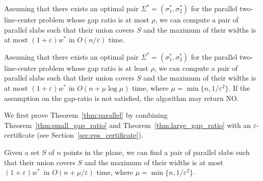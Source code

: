 \documentclass[english,a4paper, cleveref, autoref, thm-restate, nolineno]{socg-lipics-v2021}
\theoremstyle{star}
\theoremstyle{claimstar}
\newcommand{\eps}{\ensuremath{\varepsilon}}
\begin{document}
\begin{theorem}
    \label{thm:small_gap_ratio}
    Assuming that there exists an optimal pair $\Sigma^* = (\sigma_1^*, \sigma_2^*)$ for the parallel two-line-center problem whose gap ratio is at most $\rho$, 
    we can compute a pair of parallel slabs such that their union covers $S$ and the maximum of their widths is at most $(1+\eps)w^*$ in $O(n/\eps)$ time. 
\end{theorem}

\begin{theorem}
    \label{thm:large_gap_ratio}
    Assuming that there exists an optimal pair $\Sigma^* = (\sigma_1^*, \sigma_2^*)$ for the parallel two-line-center problem whose gap ratio is at least $\rho$, 
    we can compute a pair of parallel slabs such that their union covers $S$ and the maximum of their widths is at most $(1+\eps)w^*$ in $O(n+ \mu\log \mu)$ time, where $\mu = \min \{n, 1/\eps^2\}$. 
    If the assumption on the gap-ratio is not satisfied, the algorithm may return NO.
\end{theorem}





We first prove  Theorem~\ref{thm:parallel} by combining Theorem~\ref{thm:small_gap_ratio} and Theorem~\ref{thm:large_gap_ratio} with an $\eps$-certificate (see Section~\ref{sec:eps_certificate}).  



\begin{theorem}
    \label{thm:parallel}
    Given a set $S$ of $n$ points in the plane, we can find a pair of parallel slabs such that their union covers $S$ and the maximum of their widths is at most $(1+\eps)w^*$~in $O(n + \mu /\eps)$ time, where $\mu = \min \{n, 1/\eps^2\}$.  
\end{theorem}
\end{document}
